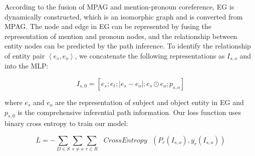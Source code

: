 \documentclass{article}
\begin{document}
According to the fusion of MPAG and mention-pronoun coreference, EG is dynamically constructed, which is an isomorphic graph and is converted from MPAG. The node and edge in EG can be represented by fusing the representation of mention and pronoun nodes, and the relationship between entity nodes can be predicted by the path inference. To identify the relationship of entity pair $\left< e_{s},e_{o} \right>$, we concatenate the following representations as $I_{s,o}$ and into the MLP: 

\begin{equation}
I_{s, 0}=\left[e_{s} ; e_{t} ;\left|e_{s}-e_{o}\right| ; e_{s} \odot e_{o} ; p_{s, o}\right]
\label{eql13}
\end{equation}

where $e_{s}$ and $e_{o}$ are the representation of subject and object entity in EG and $p_{s, 0}$ is the comprehensive inferential path information. Our loss function uses binary cross entropy to train our model:

\begin{equation}
L=-\sum_{D \in S} \sum_{s \neq o} \sum_{r \in R} \text { $CrossEntropy$ }\left(P_{r}\left(I_{s, o}\right), \overline{y_{r}}\left(I_{s, o}\right)\right)
\label{eql14}
\end{equation}
\end{document}

